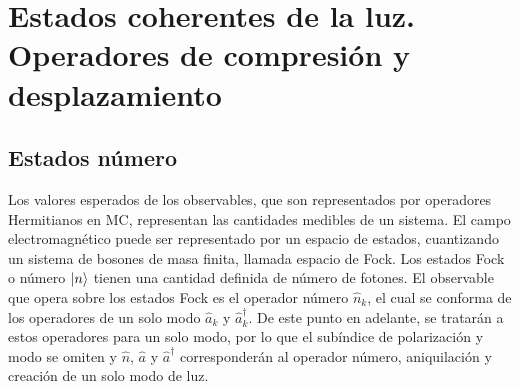 \chapter{Estados coherentes de la luz. Operadores de compresión y desplazamiento}

\section{Estados número}


Los valores esperados de los observables, que son representados por operadores Hermitianos en MC, representan las cantidades medibles de un sistema. El campo electromagnético puede ser representado por un espacio de estados, cuantizando un sistema de bosones de masa finita, llamada espacio de Fock. Los estados Fock o número $\ket{n}$ tienen una cantidad definida de número de fotones. El observable que opera sobre los estados Fock es el operador número $\hat{n}_{k}$, el cual se conforma de los operadores de un solo modo $\hat{a}_{k}$ y $\hat{a}^{\dagger}_{k}$. De este punto en adelante, se tratarán a estos operadores para un solo modo, por lo que el subíndice de polarización y modo se omiten y $\hat{n}$, $\hat{a}$ y $\hat{a}^{\dagger}$ corresponderán al operador número, aniquilación y creación de un solo modo de luz.


